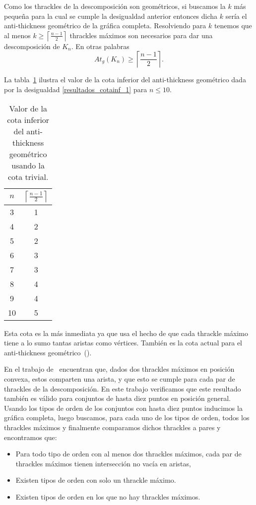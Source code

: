 Como los thrackles de la descomposición son geométricos, si buscamos la $k$ más
pequeña para la cual se cumple la desigualdad anterior entonces  dicha $k$
sería el anti-thickness geométrico de la gráfica completa.
Resolviendo para $k$  tenemos que al menos
$k\geq\left\lceil\frac{n-1}{2}\right\rceil$ thrackles máximos son necesarios
para dar una descomposición de $K_n$. En otras palabras
\begin{equation}
  At_g(K_n) \geq  \left\lceil\frac{n-1}{2}\right\rceil.
  \label{resultados_cotainf_1}
\end{equation}

La tabla~\ref{table:attrivialinf} ilustra el valor de la cota inferior del
anti-thickness geométrico dada por la desigualdad \ref{resultados_cotainf_1}
para $n\leq 10$.
\begin{table}[t]
  \centering
  \begin{tabular}{|c|c|}
    \hline
    $n$ & $\left\lceil\frac{n-1}{2}\right\rceil$ \\[5pt] \hline\hline
    3   & 1  \\
    4   & 2  \\
    5   & 2  \\
    6   & 3  \\
    7   & 3  \\
    8   & 4  \\
    9   & 4  \\
    10  & 5  \\ \hline
  \end{tabular}
  \caption{ Valor de la cota inferior del anti-thickness geométrico usando la cota trivial. }
  \label{table:attrivialinf}
\end{table}
Esta cota es la más inmediata ya que usa el hecho de que cada thrackle máximo tiene a lo sumo tantas aristas como vértices. También es la cota actual para el anti-thickness geométrico~(\cite{Dujmovic2017}).

En el trabajo de~\cite{Fabila-Monroy2018} encuentran que, dados dos thrackles
máximos en posición convexa, estos comparten una arista, y que esto se cumple
para cada par de thrackles de la descomposición. En este trabajo verificamos
que este resultado también es válido para conjuntos de hasta diez puntos en
posición general. Usando los tipos de orden de los conjuntos
con hasta diez puntos inducimos la gráfica completa, luego buscamos, para
cada uno de los tipos de orden, todos los thrackles máximos y
finalmente comparamos dichos thrackles a pares y encontramos que:
\begin{itemize}
  \item Para todo tipo de orden con al menos dos thrackles máximos, cada par de thrackles máximos tienen intersección no vacía en aristas,
  \item Existen tipos de orden con solo un thrackle máximo.
  \item Existen tipos de orden en los que no hay thrackles máximos.
\end{itemize}

